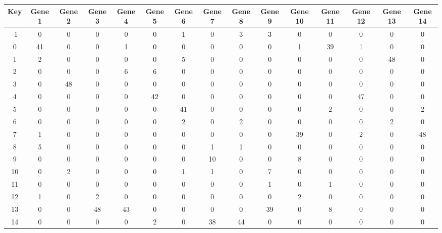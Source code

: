 \begin{tabular}{|c|c|c|c|c|c|c|c|c|c|c|c|c|c|c|}
\hline
Key & Gene 1 & Gene 2 & Gene 3 & Gene 4 & Gene 5 & Gene 6 & Gene 7 & Gene 8 & Gene 9 & Gene 10 & Gene 11 & Gene 12 & Gene 13 & Gene 14 \\
\hline
-1 & 0 & 0 & 0 & 0 & 0 & 1 & 0 & 3 & 3 & 0 & 0 & 0 & 0 & 0 \\
0 & 41 & 0 & 0 & 1 & 0 & 0 & 0 & 0 & 0 & 1 & 39 & 1 & 0 & 0 \\
1 & 2 & 0 & 0 & 0 & 0 & 5 & 0 & 0 & 0 & 0 & 0 & 0 & 48 & 0 \\
2 & 0 & 0 & 0 & 6 & 6 & 0 & 0 & 0 & 0 & 0 & 0 & 0 & 0 & 0 \\
3 & 0 & 48 & 0 & 0 & 0 & 0 & 0 & 0 & 0 & 0 & 0 & 0 & 0 & 0 \\
4 & 0 & 0 & 0 & 0 & 42 & 0 & 0 & 0 & 0 & 0 & 0 & 47 & 0 & 0 \\
5 & 0 & 0 & 0 & 0 & 0 & 41 & 0 & 0 & 0 & 0 & 2 & 0 & 0 & 2 \\
6 & 0 & 0 & 0 & 0 & 0 & 2 & 0 & 2 & 0 & 0 & 0 & 0 & 2 & 0 \\
7 & 1 & 0 & 0 & 0 & 0 & 0 & 0 & 0 & 0 & 39 & 0 & 2 & 0 & 48 \\
8 & 5 & 0 & 0 & 0 & 0 & 0 & 1 & 1 & 0 & 0 & 0 & 0 & 0 & 0 \\
9 & 0 & 0 & 0 & 0 & 0 & 0 & 10 & 0 & 0 & 8 & 0 & 0 & 0 & 0 \\
10 & 0 & 2 & 0 & 0 & 0 & 1 & 1 & 0 & 7 & 0 & 0 & 0 & 0 & 0 \\
11 & 0 & 0 & 0 & 0 & 0 & 0 & 0 & 0 & 1 & 0 & 1 & 0 & 0 & 0 \\
12 & 1 & 0 & 2 & 0 & 0 & 0 & 0 & 0 & 0 & 2 & 0 & 0 & 0 & 0 \\
13 & 0 & 0 & 48 & 43 & 0 & 0 & 0 & 0 & 39 & 0 & 8 & 0 & 0 & 0 \\
14 & 0 & 0 & 0 & 0 & 2 & 0 & 38 & 44 & 0 & 0 & 0 & 0 & 0 & 0 \\
\hline
\end{tabular}